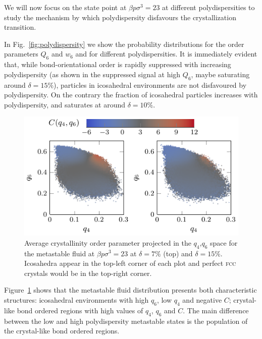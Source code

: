 \documentclass[twocolumn,superscriptaddress]{revtex4-1}
\begin{document}
We will now focus on the state point at $\beta p\sigma^3=23$ at different polydispersities to
study the mechanism by which polydispersity disfavours the crystallization transition.

In Fig.~\ref{fig:polydispersity} we show the probability distributions for the order
parameters $Q_6$ and $w_6$ and for different polydispersities. It is immediately
evident that, while bond-orientational order is rapidly suppressed with increasing
polydispersity (as shown in the suppressed signal at high $Q_6$, maybe saturating around $\delta=15\%$), particles in icosahedral
environments are not disfavoured by polydispersity. On the contrary the fraction of
icosahedral particles increases with polydispersity, and saturates at around $\delta=10\%$.

\begin{figure}
 \centering
 \includegraphics{fig_Cmaps}
 \caption{Average crystallinity order parameter projected in the $q_4$,$q_6$ space for the metastable fluid at $\beta p\sigma^3=23$ at $\delta=7\%$ (top) and $\delta=15\%$. Icosahedra appear in the top-left corner of each plot and perfect \textsc{fcc} crystals would be in the top-right corner.}
 \label{fig:Cmaps}
\end{figure}


Figure~\ref{fig:Cmaps} shows that the metastable fluid distribution presents both characteristic
structures: icosahedral environments with high $q_6$, low $q_4$ and negative $C$; crystal-like bond ordered regions with high values of
$q_4$, $q_6$ and $C$. The main difference between the low and
high polydispersity metastable states is the population of the crystal-like bond ordered regions.
\end{document}
